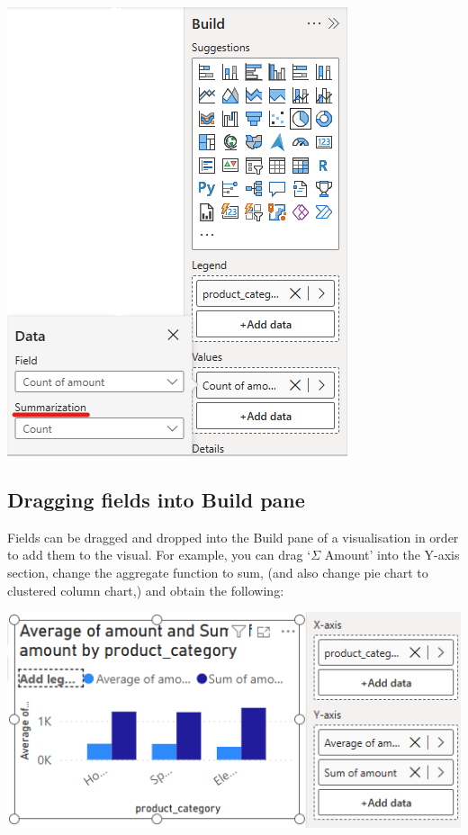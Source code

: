 \documentclass[10pt, openany, twocolumn]{book}
\begin{document}
\begin{center}
    \includegraphics[width = 0.72\columnwidth]{images/Build_columns_change_agg.png}
\end{center}

\subsection*{Dragging fields into Build pane}

Fields can be dragged and dropped into the Build pane of a visualisation in order to add them to the visual. For example, you can drag `$\Sigma$ Amount' into the Y-axis section, change the aggregate function to sum, (and also change pie chart to clustered column chart,) and obtain the following:
\begin{center}
    \includegraphics[width = 0.99\columnwidth]{images/dragging_fields.png}
\end{center}
\end{document}
